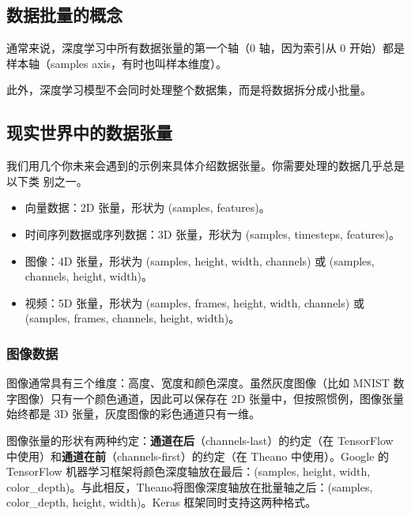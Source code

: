 \subsection{数据批量的概念}
通常来说，深度学习中所有数据张量的第一个轴（0 轴，因为索引从 0 开始）都是样本轴（samples axis，有时也叫样本维度）。

此外，深度学习模型不会同时处理整个数据集，而是将数据拆分成小批量。

\subsection{现实世界中的数据张量}
我们用几个你未来会遇到的示例来具体介绍数据张量。你需要处理的数据几乎总是以下类
别之一。
\begin{itemize}
    \item 向量数据：2D 张量，形状为 (samples, features)。
    \item  时间序列数据或序列数据：3D 张量，形状为 (samples, timesteps, features)。
    \item  图像：4D 张量，形状为 (samples, height, width, channels) 或 (samples, channels, height, width)。
    \item  视频：5D 张量，形状为 (samples, frames, height, width, channels) 或 (samples, frames, channels, height, width)。
\end{itemize}

\subsubsection*{图像数据}
图像通常具有三个维度：高度、宽度和颜色深度。虽然灰度图像（比如 MNIST 数字图像）只有一个颜色通道，因此可以保存在 2D 张量中，但按照惯例，图像张量始终都是 3D 张量，灰度图像的彩色通道只有一维。

图像张量的形状有两种约定：\textbf{通道在后}（channels-last）的约定（在 TensorFlow 中使用）和\textbf{通道在前}（channels-first）的约定（在 Theano 中使用）。Google 的 TensorFlow 机器学习框架将颜色深度轴放在最后：(samples, height, width, color\_depth)。与此相反，Theano将图像深度轴放在批量轴之后：(samples, color\_depth, height, width)。Keras 框架同时支持这两种格式。
